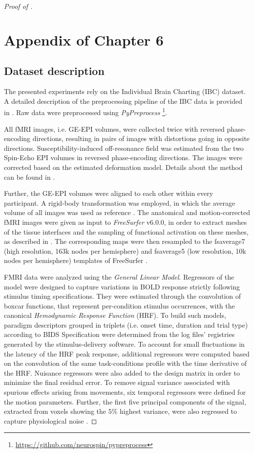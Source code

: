 \begin{proof}[Proof of ]
\section{Appendix of Chapter 6}

\subsection{Dataset description}
%
The presented experiments rely on the Individual Brain Charting (IBC) dataset.
%
A detailed description of the preprocessing pipeline of the IBC data is provided
in \citep{Pinho2021}.
%
Raw data were preprocessed using \emph{PyPreprocess}
\footnote{\url{https://github.com/neurospin/pypreprocess}}.

All fMRI images, i.e. GE-EPI volumes, were collected twice with reversed
phase-encoding directions, resulting in pairs of images with distortions going
in opposite directions.
%
Susceptibility-induced off-resonance field was estimated from the two Spin-Echo
EPI volumes in reversed phase-encoding directions.
%
The images were corrected based on the estimated deformation model.
%
Details about the method can be found in \citep{Andersson2003}.

Further, the GE-EPI volumes were aligned to each other within every participant.
%
A rigid-body transformation was employed, in which the average volume of all
images was used as reference \citep{Friston1995}.
%
The anatomical and motion-corrected fMRI images were given as input to
\emph{FreeSurfer} v6.0.0, in order to extract meshes of the tissue
interfaces and the sampling of functional activation on these meshes, as
described in \citep{vanessen2012}.
%
The corresponding maps were then resampled to the fsaverage7 (high resolution,
163k nodes per hemisphere) and fsaverage5 (low resolution, 10k nodes per hemisphere) templates of
FreeSurfer \citep{Fischl1999}.

FMRI data were analyzed using the \textit{General Linear Model}.
%
Regressors of the model were designed to capture variations in BOLD response
strictly following stimulus timing specifications.
%
They were estimated through the convolution of boxcar functions, that represent
per-condition stimulus occurrences, with the canonical \textit{Hemodynamic
  Response Function} (HRF).
%
To build such models, paradigm descriptors grouped in triplets (i.e. onset time,
duration and trial type) according to BIDS Specification were determined from
the log files' registries generated by the stimulus-delivery software.
%
To account for small fluctuations in the latency of the HRF peak response,
additional regressors were computed based on the convolution of the same
task-conditions profile with the time derivative of the HRF.
%
Nuisance regressors were also added to the design matrix in order to minimize
the final residual error.
%
To remove signal variance associated with spurious effects arising from
movements, six temporal regressors were defined for the motion parameters.
%
Further, the first five principal components of the signal, extracted from
voxels showing the $5\%$ highest variance, were also regressed to capture
physiological noise \citep{Behzadi2007}.


\end{proof}
